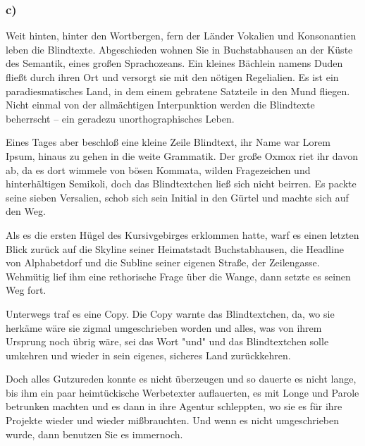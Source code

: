 \subsubsection*{c)}
Weit hinten, hinter den Wortbergen, fern der Länder Vokalien und Konsonantien leben die Blindtexte. Abgeschieden wohnen Sie in Buchstabhausen an der Küste des Semantik, eines großen Sprachozeans. Ein kleines Bächlein namens Duden fließt durch ihren Ort und versorgt sie mit den nötigen Regelialien. Es ist ein paradiesmatisches Land, in dem einem gebratene Satzteile in den Mund fliegen. Nicht einmal von der allmächtigen Interpunktion werden die Blindtexte beherrscht – ein geradezu unorthographisches Leben.

Eines Tages aber beschloß eine kleine Zeile Blindtext, ihr Name war Lorem Ipsum, hinaus zu gehen in die weite Grammatik. Der große Oxmox riet ihr davon ab, da es dort wimmele von bösen Kommata, wilden Fragezeichen und hinterhältigen Semikoli, doch das Blindtextchen ließ sich nicht beirren. Es packte seine sieben Versalien, schob sich sein Initial in den Gürtel und machte sich auf den Weg.

Als es die ersten Hügel des Kursivgebirges erklommen hatte, warf es einen letzten Blick zurück auf die Skyline seiner Heimatstadt Buchstabhausen, die Headline von Alphabetdorf und die Subline seiner eigenen Straße, der Zeilengasse. Wehmütig lief ihm eine rethorische Frage über die Wange, dann setzte es seinen Weg fort.

Unterwegs traf es eine Copy. Die Copy warnte das Blindtextchen, da, wo sie herkäme wäre sie zigmal umgeschrieben worden und alles, was von ihrem Ursprung noch übrig wäre, sei das Wort "und" und das Blindtextchen solle umkehren und wieder in sein eigenes, sicheres Land zurückkehren.

Doch alles Gutzureden konnte es nicht überzeugen und so dauerte es nicht lange, bis ihm ein paar heimtückische Werbetexter auflauerten, es mit Longe und Parole betrunken machten und es dann in ihre Agentur schleppten, wo sie es für ihre Projekte wieder und wieder mißbrauchten. Und wenn es nicht umgeschrieben wurde, dann benutzen Sie es immernoch.
